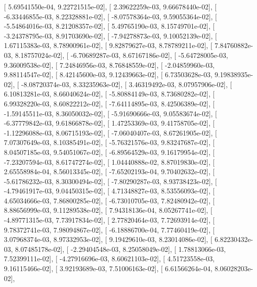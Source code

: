 \documentclass{article}
\begin{document}
       [  5.69541550e-04,   9.22721515e-02],
       [  2.39622259e-03,   9.66678440e-02],
       [ -6.33446855e-03,   8.22328881e-02],
       [ -8.07578364e-03,   9.59055364e-02],
       [ -5.54864016e-03,   8.21208357e-02],
       [  5.49765190e-03,   8.15749701e-02],
       [ -3.24378795e-03,   8.91703690e-02],
       [ -7.94278873e-03,   9.10052139e-02],
       [  1.67115383e-03,   8.78900961e-02],
       [  9.82879627e-03,   8.78789211e-02],
       [  7.84760882e-03,   8.18757024e-02],
       [ -6.70689287e-03,   8.67167186e-02],
       [ -5.64728005e-03,   9.36009538e-02],
       [  7.24846956e-03,   8.76848559e-02],
       [ -2.04859960e-03,   9.88114547e-02],
       [  8.42145600e-03,   9.12439663e-02],
       [  6.73503628e-03,   9.19838935e-02],
       [ -8.08720374e-03,   8.33235963e-02],
       [  3.46319492e-03,   8.07957906e-02],
       [  6.10813281e-03,   8.66040624e-02],
       [ -5.80884149e-03,   8.73680282e-02],
       [  6.99328220e-03,   8.60822212e-02],
       [ -7.64114895e-03,   8.42506389e-02],
       [ -1.59145511e-03,   8.36050032e-02],
       [ -5.91690666e-03,   9.05583674e-02],
       [ -6.37779842e-03,   9.61866878e-02],
       [  1.47253369e-03,   9.41758705e-02],
       [ -1.12296088e-03,   8.06715193e-02],
       [ -7.06040407e-03,   8.67261905e-02],
       [  7.07307649e-03,   8.10385491e-02],
       [ -5.76321576e-03,   9.83247687e-02],
       [  8.04507185e-03,   9.54051067e-02],
       [ -6.89564529e-03,   9.16179954e-02],
       [ -7.23207594e-03,   8.61747274e-02],
       [  1.04440888e-02,   8.87019830e-02],
       [  2.65558984e-04,   8.56013345e-02],
       [ -7.65202193e-04,   9.70402632e-02],
       [ -5.61786232e-03,   8.30300494e-02],
       [ -7.80290287e-03,   8.93738423e-02],
       [ -4.79461917e-03,   9.04450315e-02],
       [  4.71348827e-03,   8.53556093e-02],
       [  4.65034666e-03,   7.86800285e-02],
       [ -6.73010705e-03,   7.82480942e-02],
       [  8.88656999e-03,   9.11289538e-02],
       [  7.94318136e-04,   8.05267741e-02],
       [ -4.89771315e-03,   7.73917834e-02],
       [  2.77820464e-03,   7.72693914e-02],
       [  9.78372741e-03,   7.98094867e-02],
       [ -6.18886700e-04,   7.77460419e-02],
       [  3.07968374e-03,   8.97332953e-02],
       [  9.19429610e-03,   8.23014086e-02],
       [  6.82230432e-03,   8.07485178e-02],
       [ -2.29404548e-03,   8.25058049e-02],
       [  1.78813066e-03,   7.52399111e-02],
       [ -4.27916696e-03,   8.60621103e-02],
       [  4.51723558e-03,   9.16115466e-02],
       [  3.92193689e-03,   7.51006163e-02],
       [  6.61566264e-04,   8.06028203e-02],
\end{document}

